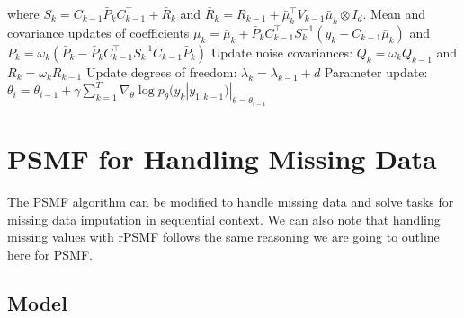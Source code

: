 \documentclass{mldsmsc}
\begin{document}
\begin{algorithm}[H]
\begin{algorithmic}[1]
\State \hspace{2em} where $S_k = C_{k-1} \bar{P}_k C_{k-1}^\top + \bar{R}_k$ and \hspace{1em} $\bar{R}_k = R_{k-1} + \bar{\mu}_k^\top V_{k-1} \bar{\mu}_k \otimes I_d$.
\State \hspace{2em} Mean and covariance updates of coefficients
\State \hspace{3em} $\mu_k = \bar{\mu}_k + \bar{P}_k C_{k-1}^\top S_k^{-1} (y_k - C_{k-1} \bar{\mu}_k)$ and \hspace{1em} $P_k = \omega_k (\bar{P}_k - \bar{P}_k C_{k-1}^\top S_k^{-1} C_{k-1} \bar{P}_k)$
\State \hspace{2em} Update noise covariances:
\State \hspace{3em} $Q_k = \omega_k Q_{k-1}$ and $R_k = \omega_k R_{k-1}$
\State \hspace{2em} Update degrees of freedom: 
\State \hspace{3em} $\lambda_k = \lambda_{k-1} + d$
\State \hspace{1em} Parameter update: 
\State \hspace{2em} $\theta_i = \theta_{i-1} + \gamma \sum_{k=1}^T \nabla_\theta \log p_\theta (y_k | y_{1:k-1}) |_{\theta = \theta_{i-1}}$
\end{algorithmic}\label{algo:2}
\end{algorithm}

\section{PSMF for Handling Missing Data}

The PSMF algorithm can be modified to handle missing data and solve tasks for missing data imputation in sequential context. We can also note that handling missing values with rPSMF follows the same reasoning we are going to outline here for PSMF.

\subsection{Model}
\end{document}
